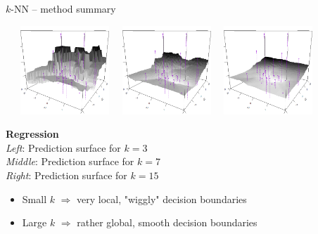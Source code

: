 \begin{frame} {$k$-NN -- method summary}
  \begin{minipage}{0.7\textwidth}
  \, \, \, \includegraphics[width=0.25\textwidth]{figure/knn-reg-3d-3.png} \, \,
  \includegraphics[width=0.25\textwidth]{figure/knn-reg-3d-7.png} \, \,
  \includegraphics[width=0.25\textwidth]{figure/knn-reg-3d-15.png}
  \end{minipage}%
  \hfill
  \begin{minipage}{0.25\textwidth}
    \tiny
    \raggedright
    \textbf{Regression} \\
    \textit{Left}: Prediction surface for $k = 3$\\ 
    \textit{Middle}: Prediction surface for $k = 7$\\
    \textit{Right}: Prediction surface for $k = 15$
  \end{minipage}

  \medskip

  \begin{itemize}
      \item Small $k$ $\Rightarrow$ very local, "wiggly" decision boundaries
      \item Large $k$ $\Rightarrow$ rather global, smooth decision boundaries
  \end{itemize}

\end{frame}



